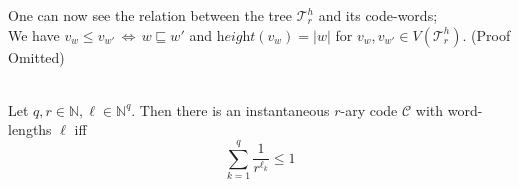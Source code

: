 \documentclass[12pt]{article}
\newcommand{\T}[0]{{\mathcal{T}_r^h}}
\newcommand{\he}[0]{\textit{height}}
\newenvironment{statement2}[2]{\begin{trivlist}
\item[\hskip \labelsep {\bfseries #1}\hskip \labelsep {\bfseries #2}]}{\end{trivlist}}
\newenvironment{statement3}[3]{\begin{trivlist}
\item[\hskip \labelsep {\bfseries #1}\hskip \labelsep {\bfseries #2} {#3}\textbf{.}]}{\end{trivlist}}
\begin{document}
\begin{statement2}{(1.6)}{Remark.} One can now see the relation between the tree $\T$ and its code-words;\\
    We have $v_w \leq v_{w'} \,\Longleftrightarrow\, w \sqsubseteq w'$
    and $\he(v_w) = |w|$ for $v_w, v_{w'} \in V(\T)$. (Proof Omitted)
\end{statement2}

\begin{statement3}{(1.7)}{Theorem}{(Kraft's Inequality)}\strut\\[2pt]
    Let $q,r \in \mathbb{N}, \ell \in \mathbb{N}^q$. Then there is an instantaneous $r$-ary code $\mathcal{C}$
    with word-lengths $\ell$ iff
    \begin{equation}
        \sum_{k=1}^{q} \frac{1}{r^{\ell_k}} \leq 1
    \end{equation}


\end{statement3}
\end{document}
